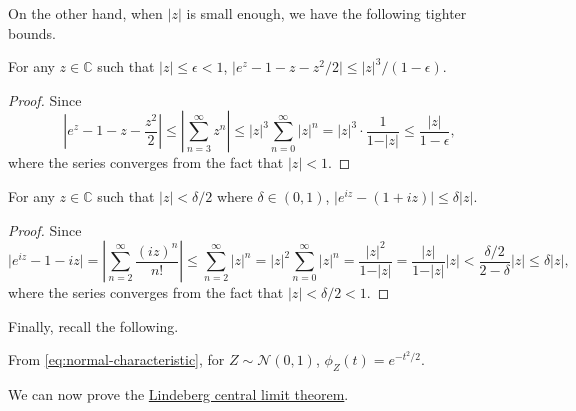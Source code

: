 On the other hand, when \(\vert z \vert \) is small enough, we have the following tighter bounds.

\begin{lemma}\label{lma:Lindeberg-CLT-3}
	For any \(z \in \mathbb{C} \) such that \(\vert z \vert \leq \epsilon < 1\), \(\vert e^z - 1 - z - z^2 / 2 \vert \leq \vert z \vert ^3 / (1 - \epsilon )\).
\end{lemma}
\begin{proof}
	Since
	\[
		\left\vert e^z - 1 - z - \frac{z^2}{2} \right\vert
		\leq \left\vert \sum_{n=3}^{\infty} z^n \right\vert
		\leq \vert z \vert ^3 \sum_{n=0}^{\infty} \vert z \vert ^n
		= \vert z \vert ^3 \cdot \frac{1}{1 - \vert z \vert }
		\leq \frac{\vert z \vert }{1 - \epsilon },
	\]
	where the series converges from the fact that \(\vert z \vert < 1\).
\end{proof}

\begin{lemma}\label{lma:Lindeberg-CLT-4}
	For any \(z \in \mathbb{C} \) such that \(\vert z \vert < \delta / 2\) where \(\delta \in (0, 1)\), \(\vert e^{iz} - (1 + iz) \vert \leq \delta \vert z \vert \).
\end{lemma}
\begin{proof}
	Since
	\[
		\vert e^{iz} - 1 - iz \vert
		= \left\vert \sum_{n=2}^{\infty} \frac{(iz)^n}{n!} \right\vert
		\leq \sum_{n=2}^{\infty} \vert z \vert ^n
		= \vert z \vert ^2 \sum_{n=0}^{\infty} \vert z \vert ^n
		= \frac{\vert z \vert ^2}{1 - \vert z \vert }
		= \frac{\vert z \vert }{1 - \vert z \vert } \vert z \vert
		< \frac{\delta / 2}{2 - \delta } \vert z \vert
		\leq \delta \vert z \vert ,
	\]
	where the series converges from the fact that \(\vert z \vert < \delta / 2 < 1\).
\end{proof}

Finally, recall the following.

\begin{prev}
	From \autoref{eq:normal-characteristic}, for \(Z \sim \mathcal{N} (0, 1)\), \(\phi _Z(t) = e^{-t^2 / 2}\).
\end{prev}

We can now prove the \hyperref[thm:Lindeberg-CLT]{Lindeberg central limit theorem}.

